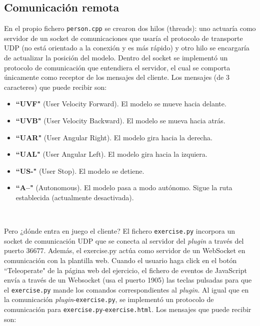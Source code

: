 \subsection{Comunicación remota}
\label{subsec:comunicacion_remota}

En el propio fichero \texttt{person.cpp} se crearon dos hilos (threads): uno actuaría como servidor de un socket de comunicaciones que usaría el protocolo de transporte UDP (no está orientado a la conexión y es más rápido) y otro hilo se encargaría de actualizar la posición del modelo. Dentro del socket se implementó un protocolo de comunicación que entendiera el servidor, el cual se comporta únicamente como receptor de los mensajes del cliente. Los mensajes (de 3 caracteres) que puede recibir son:\\

\begin{itemize}
	\item \textbf{``UVF"} (User Velocity Forward). El modelo se mueve hacia delante.
	\item \textbf{``UVB"} (User Velocity Backward). El modelo se mueva hacia atrás.
	\item \textbf{``UAR"} (User Angular Right). El modelo gira hacia la derecha.
	\item \textbf{``UAL"} (User Angular Left). El modelo gira hacia la izquiera.
	\item \textbf{``US-"} (User Stop). El modelo se detiene.
	\item \textbf{``A--"} (Autonomous). El modelo pasa a modo autónomo. Sigue la ruta establecida (actualmente desactivada).
\end{itemize}\

Pero ¿dónde entra en juego el cliente? El fichero \texttt{exercise.py} incorpora un socket de comunicación UDP que se conecta al servidor del \textit{plugin} a través del puerto 36677. Además, el exercise.py actúa como servidor de un WebSocket en comunicación con la plantilla web. Cuando el usuario haga click en el botón ``Teleoperate" de la página web del ejercicio, el fichero de eventos de JavaScript envía a través de un Websocket (usa el puerto 1905) las teclas pulsadas para que el \texttt{exercise.py} mande los comandos correspondientes al \textit{plugin}. Al igual que en la comunicación \textit{plugin}-\texttt{exercise.py}, se implementó un protocolo de comunicación para \texttt{exercise.py}-\texttt{exercise.html}. Los mensajes que puede recibir son:\\

